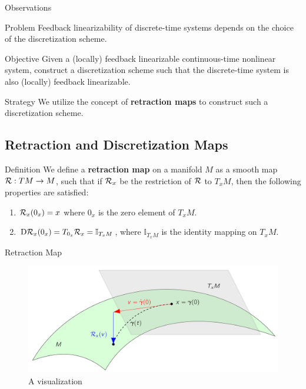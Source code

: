 \documentclass{beamer}
\begin{document}
\begin{frame}{Observations}
  \begin{block}{Problem}
    Feedback linearizability of discrete-time systems depends on the choice of the discretization scheme.
  \end{block}

  \begin{block}{Objective}
    Given a (locally) feedback linearizable continuous-time nonlinear system, construct a discretization scheme such that the discrete-time system is also (locally) feedback linearizable.
  \end{block}

  \begin{block}{Strategy}
    We utilize the concept of \textbf{retraction maps} to construct such a discretization scheme.
  \end{block}
  
\end{frame}
% 

\subsection{Retraction and Discretization Maps}

\begin{frame}{Definition}
  We define a \textbf{retraction map} on a manifold $M$ as a smooth map $\mathcal{R}: TM \to M$, such that if $\mathcal{R}_x$ be the restriction of $\mathcal{R}$ to $T_x M$, then the following properties are satisfied:

    \begin{enumerate}
        \item $\mathcal{R}_x (0_x) = x$ where $0_x$ is the zero element of $T_x M$.
        \item $\text{D}\mathcal{R}_x (0_x ) = T_{0_x} \mathcal{R}_x = \mathbb{I}_{T_x M} $, where $\mathbb{I}_{T_x M}$ is the identity mapping on $T_x M$.
    \end{enumerate}
  
\end{frame}

\begin{frame}{Retraction Map}
\begin{figure}
  \centering
  \includegraphics[width=\textwidth]{../Figures/retraction.png}
  \caption{A visualization}
\end{figure}
\end{frame}
\end{document}
